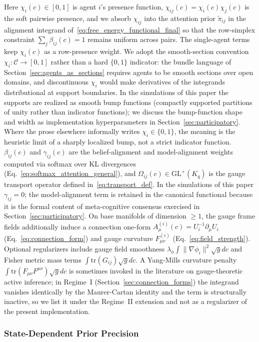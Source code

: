 \documentclass[11pt]{article}
\begin{document}
Here $\chi_i(c) \in [0, 1]$ is agent $i$'s presence function, $\chi_{ij}(c) = \chi_i(c) \chi_j(c)$ is the soft pairwise presence, and we absorb $\chi_{ij}$ into the attention prior $\tilde{\pi}_{ij}$ in the alignment integrand of~\eqref{eq:free_energy_functional_final} so that the row-simplex constraint $\sum_j \beta_{ij}(c) = 1$ remains uniform across pairs. The single-agent terms keep $\chi_i(c)$ as a row-presence weight. We adopt the smooth-section convention $\chi_i: \mathcal{C} \to [0, 1]$ rather than a hard $\{0, 1\}$ indicator: the bundle language of Section~\ref{sec:agents_as_sections} requires agents to be smooth sections over open domains, and discontinuous $\chi_i$ would make derivatives of the integrands distributional at support boundaries. In the simulations of this paper the supports are realized as smooth bump functions (compactly supported partitions of unity rather than indicator functions); we discuss the bump-function shape and width as implementation hyperparameters in Section~\ref{sec:participatory}. Where the prose elsewhere informally writes $\chi_i \in \{0, 1\}$, the meaning is the heuristic limit of a sharply localized bump, not a strict indicator function. $\beta_{ij}(c)$ and $\gamma_{ij}(c)$ are the belief-alignment and model-alignment weights computed via softmax over KL divergences (Eq.~\ref{eq:softmax_attention_general}), and $\Omega_{ij}(c) \in \mathrm{GL}^+(K_q)$ is the gauge transport operator defined in~\eqref{eq:transport_def}. In the simulations of this paper $\gamma_{ij} = 0$; the model-alignment term is retained in the canonical functional because it is the formal content of meta-cognitive consensus exercised in Section~\ref{sec:participatory}. On base manifolds of dimension $\geq 1$, the gauge frame fields additionally induce a connection one-form $A_\mu^{(i)}(c) = U_i^{-1}\partial_\mu U_i$ (Eq.~\ref{eq:connection_form}) and gauge curvature $F_{\mu\nu}^{(i)}$ (Eq.~\ref{eq:field_strength}). Optional regularizers include gauge field smoothness $\lambda_\phi \int \|\nabla \phi_i\|^2  \sqrt{g} dc$ and Fisher metric mass terms $\int \mathrm{tr}(G_{ij})  \sqrt{g} dc$. A Yang-Mills curvature penalty $\int \mathrm{tr}(F_{\mu\nu} F^{\mu\nu})  \sqrt{g} dc$ is sometimes invoked in the literature on gauge-theoretic active inference; in Regime~I (Section~\ref{sec:connection_forms}) the integrand vanishes identically by the Maurer-Cartan identity and the term is structurally inactive, so we list it under the Regime~II extension and not as a regularizer of the present implementation.

\subsubsection{State-Dependent Prior Precision}
\label{sec:state_dependent_precision}
\end{document}
